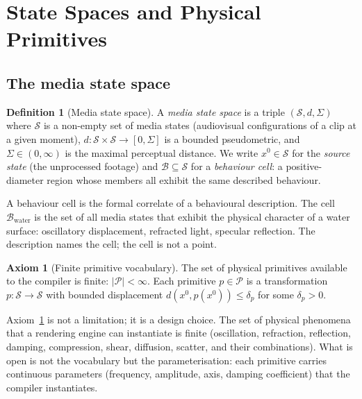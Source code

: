 \documentclass[twocolumn,11pt,a4paper]{article}
\theoremstyle{mee}
\theoremstyle{definition}
\newtheorem{definition}[theorem]{Definition}
\newtheorem{axiom}{Axiom}
\theoremstyle{remark}
\newcommand{\State}{\mathcal{S}}
\newcommand{\BState}{\mathcal{B}}
\newcommand{\src}{x^{0}}
\newcommand{\Phys}{\mathcal{P}}
\newcommand{\dist}{d}
\newcommand{\Sig}{\Sigma}
\begin{document}
\section{State Spaces and Physical Primitives}
\label{sec:state}

\subsection{The media state space}

\begin{definition}[Media state space]
\label{def:state}
A \emph{media state space} is a triple $(\State, \dist, \Sig)$ where
$\State$ is a non-empty set of media states (audiovisual configurations
of a clip at a given moment), $\dist:\State\times\State\to[0,\Sig]$ is a
bounded pseudometric, and $\Sig\in(0,\infty)$ is the maximal perceptual
distance. We write $\src\in\State$ for the \emph{source state} (the
unprocessed footage) and $\BState\subseteq\State$ for a
\emph{behaviour cell}: a positive-diameter region whose members all
exhibit the same described behaviour.
\end{definition}

A behaviour cell is the formal correlate of a behavioural description. The
cell $\BState_{\text{water}}$ is the set of all media states that exhibit
the physical character of a water surface: oscillatory displacement,
refracted light, specular reflection. The description names the cell; the
cell is not a point.

\begin{axiom}[Finite primitive vocabulary]
\label{ax:finite}
The set of physical primitives available to the compiler is finite:
$|\Phys|<\infty$. Each primitive $p\in\Phys$ is a transformation
$p:\State\to\State$ with bounded displacement $\dist(\src, p(\src))\le
\delta_p$ for some $\delta_p>0$.
\end{axiom}

Axiom~\ref{ax:finite} is not a limitation; it is a design choice. The
set of physical phenomena that a rendering engine can instantiate is
finite (oscillation, refraction, reflection, damping, compression, shear,
diffusion, scatter, and their combinations). What is open is not the
vocabulary but the parameterisation: each primitive carries continuous
parameters (frequency, amplitude, axis, damping coefficient) that the
compiler instantiates.
\end{document}

